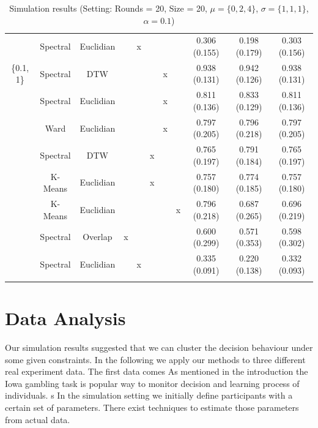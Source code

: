 \documentclass[12pt,a4paper,bibliography=totocnumbered,listof=totocnumbered]{scrartcl}
\begin{document}
\begin{table}[!htbp]
\begin{tabularx}{\textwidth}{ ccccccccccc}
		& Spectral & Euclidian &  & x &  &  &  & 0.306 (0.155) & 0.198 (0.179) & 0.303 (0.156) \\ 
		\{0.1, 1\} & Spectral & DTW &  &  &  & x &  & 0.938 (0.131) & 0.942 (0.126) & 0.938 (0.131) \\ 
		& Spectral & Euclidian &  &  &  & x &  & 0.811 (0.136) & 0.833 (0.129) & 0.811 (0.136) \\ 
		& Ward  & Euclidian &  &  &  & x &  & 0.797 (0.205) & 0.796 (0.218) & 0.797 (0.205) \\ 
		& Spectral & DTW &  &  & x &  &  & 0.765 (0.197) & 0.791 (0.184) & 0.765 (0.197) \\ 
		& K-Means & Euclidian &  &  & x &  &  & 0.757 (0.180) & 0.774 (0.185) & 0.757 (0.180) \\ 
		& K-Means & Euclidian &  &  &  &  & x & 0.796 (0.218) & 0.687 (0.265) & 0.696 (0.219) \\ 
		& Spectral & Overlap & x &  &  &  &  & 0.600 (0.299) & 0.571 (0.353) & 0.598 (0.302) \\ 
		& Spectral & Euclidian &  & x &  &  &  & 0.335 (0.091) & 0.220 (0.138) & 0.332 (0.093) \\ 
		\hline \\
	\end{tabularx} 
	\caption{Simulation results (Setting: Rounds = 20, Size = 20, $\mu = \{0,2,4\}$, $\sigma =  \{1,1,1\}$, $\alpha = 0.1$)} 
\end{table} 









\section{Data Analysis}

Our simulation results suggested that we can cluster the decision behaviour under some given constraints. In the following we apply our methods to three different real experiment data. The first data comes  As mentioned in the introduction the Iowa gambling task is popular way to monitor decision and learning process of individuals. s
In the simulation setting we initially define participants with a certain set of parameters. There exist techniques to estimate those parameters from actual data. 
\end{document}
